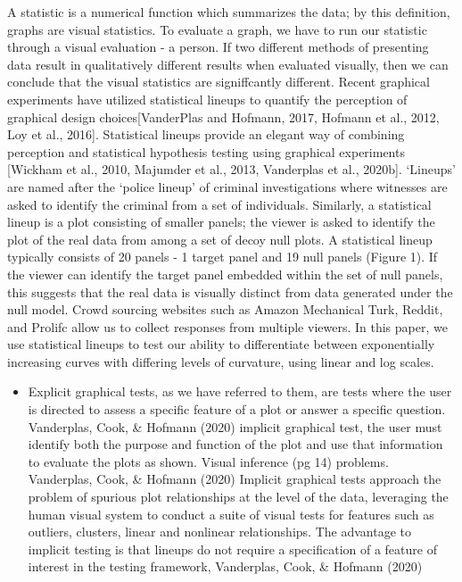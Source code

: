 \documentclass[print]{nuthesis}
\providecommand{\tightlist}{%
  \setlength{\itemsep}{0pt}\setlength{\parskip}{0pt}}
\begin{document}
A statistic is a numerical function which summarizes the data; by this definition, graphs are visual statistics.
To evaluate a graph, we have to run our statistic through a visual evaluation - a person. If two different methods
of presenting data result in qualitatively different results when evaluated visually, then we can conclude that the visual statistics are signiffcantly different. Recent graphical experiments have utilized statistical lineups to quantify the perception of graphical design choices{[}VanderPlas and Hofmann, 2017, Hofmann et al., 2012, Loy et al., 2016{]}. Statistical lineups provide an elegant way of combining perception and statistical hypothesis testing using graphical experiments {[}Wickham et al., 2010, Majumder et al., 2013, Vanderplas et al., 2020b{]}. `Lineups' are named after the `police lineup' of criminal investigations where witnesses are asked to identify the criminal from a set of
individuals. Similarly, a statistical lineup is a plot consisting of smaller panels; the viewer is asked to identify the plot of the real data from among a set of decoy null plots. A statistical lineup typically consists of 20 panels - 1 target panel and 19 null panels (Figure 1). If the viewer can identify the target panel embedded within the set of null panels, this suggests that the real data is visually distinct from data generated under the null model. Crowd sourcing websites such as Amazon Mechanical Turk, Reddit, and Prolifc allow us to collect responses from multiple
viewers. In this paper, we use statistical lineups to test our ability to differentiate between exponentially increasing curves with differing levels of curvature, using linear and log scales.

\begin{itemize}
\tightlist
\item
  Explicit graphical tests, as we have referred to them, are tests where the user is directed to assess a specific feature of a plot or answer a specific question. Vanderplas, Cook, \& Hofmann (2020)
  implicit graphical test, the user must identify both the purpose and function of the plot and use that information to evaluate the plots as shown. Visual inference (pg 14) problems. Vanderplas, Cook, \& Hofmann (2020)
  Implicit graphical tests approach the problem of spurious plot relationships at the level of the data, leveraging the human visual system to conduct a suite of visual tests for features such as outliers, clusters, linear and nonlinear relationships. The advantage to implicit testing is that lineups do not require a specification of a feature of interest in the testing framework, Vanderplas, Cook, \& Hofmann (2020)
\end{itemize}
\end{document}
